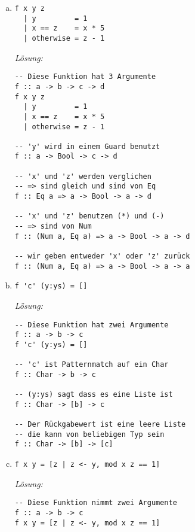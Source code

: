 \documentclass{article}
\begin{document}
\begin{enumerate} [a)]
    \item \begin{verbatim}
f x y z
  | y         = 1
  | x == z    = x * 5
  | otherwise = z - 1
          \end{verbatim}

    \textit{Lösung:}
    \begin{mdframed}[backgroundcolor=bg]
        \begin{verbatim}
-- Diese Funktion hat 3 Argumente
f :: a -> b -> c -> d
f x y z
  | y         = 1
  | x == z    = x * 5
  | otherwise = z - 1

-- 'y' wird in einem Guard benutzt
f :: a -> Bool -> c -> d

-- 'x' und 'z' werden verglichen
-- => sind gleich und sind von Eq
f :: Eq a => a -> Bool -> a -> d

-- 'x' und 'z' benutzen (*) und (-)
-- => sind von Num
f :: (Num a, Eq a) => a -> Bool -> a -> d

-- wir geben entweder 'x' oder 'z' zurück
f :: (Num a, Eq a) => a -> Bool -> a -> a
         \end{verbatim}
    \end{mdframed}

\newpage

    \item \begin{verbatim}
f 'c' (y:ys) = []
          \end{verbatim}

    \textit{Lösung:}
    \begin{mdframed}[backgroundcolor=bg]
        \begin{verbatim}
-- Diese Funktion hat zwei Argumente
f :: a -> b -> c
f 'c' (y:ys) = []

-- 'c' ist Patternmatch auf ein Char
f :: Char -> b -> c

-- (y:ys) sagt dass es eine Liste ist
f :: Char -> [b] -> c

-- Der Rückgabewert ist eine leere Liste
-- die kann von beliebigen Typ sein
f :: Char -> [b] -> [c]
         \end{verbatim}
    \end{mdframed}

    \item \begin{verbatim}
f x y = [z | z <- y, mod x z == 1]
          \end{verbatim}

    \textit{Lösung:}
    \begin{mdframed}[backgroundcolor=bg]
        \begin{verbatim}
-- Diese Funktion nimmt zwei Argumente
f :: a -> b -> c
f x y = [z | z <- y, mod x z == 1]


\end{verbatim}
\end{mdframed}
\end{enumerate}
\end{document}
